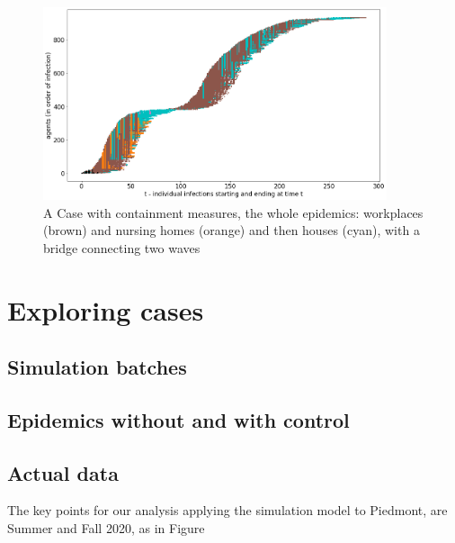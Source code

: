 \documentclass[graybox]{svmult}
\begin{document}
\begin{figure}[t]
\center
\includegraphics[width=0.9\textwidth]{with8a.png}%
\caption{A Case with containment measures, the whole epidemics: workplaces (brown) and nursing homes (orange) and then houses (cyan), with a bridge connecting two waves}
\label{workplacesNursingHomesFull}
\end{figure}


\section{Exploring cases}

\subsection{Simulation batches}

\subsection{Epidemics without and with control}

\subsection{Actual data}

The key points for our analysis applying the simulation model to Piedmont, are Summer and Fall 2020, as in Figure
\end{document}
